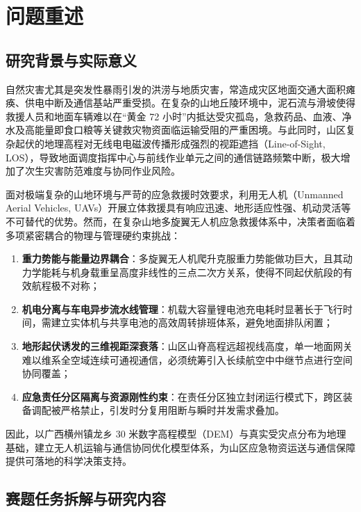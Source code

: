 \section{问题重述}

\subsection{研究背景与实际意义}

自然灾害尤其是突发性暴雨引发的洪涝与地质灾害，常造成灾区地面交通大面积瘫痪、供电中断及通信基站严重受损。在复杂的山地丘陵环境中，泥石流与滑坡使得救援人员和地面车辆难以在“黄金 72 小时”内抵达受灾孤岛，急救药品、血液、净水及高能量即食口粮等关键救灾物资面临运输受阻的严重困境。与此同时，山区复杂起伏的地理高程对无线电电磁波传播形成强烈的视距遮挡（Line-of-Sight, LOS），导致地面调度指挥中心与前线作业单元之间的通信链路频繁中断，极大增加了次生灾害防范难度与协同作业风险。

面对极端复杂的山地环境与严苛的应急救援时效要求，利用无人机（Unmanned Aerial Vehicles, UAVs）开展立体救援具有响应迅速、地形适应性强、机动灵活等不可替代的优势。然而，在复杂山地多旋翼无人机应急救援体系中，决策者面临着多项紧密耦合的物理与管理硬约束挑战：
\begin{enumerate}
    \item \textbf{重力势能与能量边界耦合}：多旋翼无人机爬升克服重力势能做功巨大，且其动力学能耗与机身载重呈高度非线性的三点二次方关系，使得不同起伏航段的有效航程极不对称；
    \item \textbf{机电分离与车电异步流水线管理}：机载大容量锂电池充电耗时显著长于飞行时间，需建立实体机与共享电池的高效周转排班体系，避免地面排队闲置；
    \item \textbf{地形起伏诱发的三维视距深衰落}：山区山脊高程远超视线高度，单一地面网关难以维系全空域连续可通视通信，必须统筹引入长续航空中中继节点进行空间协同覆盖；
    \item \textbf{应急责任分区隔离与资源刚性约束}：在责任分区独立封闭运行模式下，跨区装备调配被严格禁止，引发时分复用阻断与瞬时并发需求叠加。
\end{enumerate}

因此，以广西横州镇龙乡 30 米数字高程模型（DEM）与真实受灾点分布为地理基础，建立无人机运输与通信协同优化模型体系，为山区应急物资运送与通信保障提供可落地的科学决策支持。

\subsection{赛题任务拆解与研究内容}

